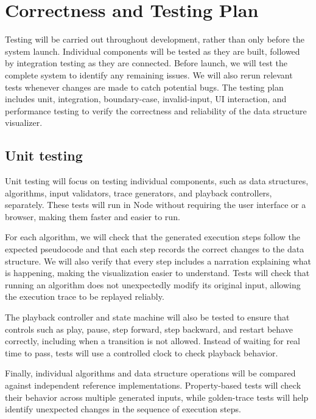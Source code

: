 \documentclass[11pt,a4paper]{article}
\begin{document}
\section{Correctness and Testing Plan}

Testing will be carried out throughout development, rather than only before the system launch. Individual components will be tested as they are built, followed by integration testing as they are connected. Before launch, we will test the complete system to identify any remaining issues. We will also rerun relevant tests whenever changes are made to catch potential bugs. The testing plan includes unit, integration, boundary-case, invalid-input, UI interaction, and performance testing to verify the correctness and reliability of the data structure visualizer.

\subsection{Unit testing}

Unit testing will focus on testing individual components, such as data structures, algorithms, input validators, trace generators, and playback controllers, separately. These tests will run in Node without requiring the user interface or a browser, making them faster and easier to run.

For each algorithm, we will check that the generated execution steps follow the expected pseudocode and that each step records the correct changes to the data structure. We will also verify that every step includes a narration explaining what is happening, making the visualization easier to understand. Tests will check that running an algorithm does not unexpectedly modify its original input, allowing the execution trace to be replayed reliably.

The playback controller and state machine will also be tested to ensure that controls such as play, pause, step forward, step backward, and restart behave correctly, including when a transition is not allowed. Instead of waiting for real time to pass, tests will use a controlled clock to check playback behavior.

Finally, individual algorithms and data structure operations will be compared against independent reference implementations. Property-based tests will check their behavior across multiple generated inputs, while golden-trace tests will help identify unexpected changes in the sequence of execution steps.
\end{document}
